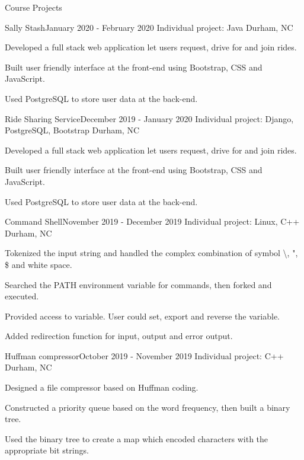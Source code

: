\documentclass{resume} %
\begin{document}
\begin{rSection}{Course Projects}
    \begin{rSubsection}{Sally Stash}{January 2020 - February 2020}
        {Individual project: Java}
        {Durham, NC}
        \item Developed a full stack web application let users request, drive for and join rides.
        \item Built user friendly interface at the front-end using Bootstrap, CSS and JavaScript.
        \item Used PostgreSQL to store user data at the back-end.
        \end{rSubsection}
    \begin{rSubsection}{Ride Sharing Service}{December 2019 - January 2020}
        {Individual project: Django, PostgreSQL, Bootstrap}
        {Durham, NC}
        \item Developed a full stack web application let users request, drive for and join rides.
        \item Built user friendly interface at the front-end using Bootstrap, CSS and JavaScript.
        \item Used PostgreSQL to store user data at the back-end.
        \end{rSubsection}

    \begin{rSubsection}{Command Shell}{November 2019 - December 2019}
    {Individual project: Linux, C++}
    {Durham, NC}
    \item Tokenized the input string and handled the complex combination of symbol \textbackslash, ", \$ and white space.
    \item Searched the PATH environment variable for commands, then forked and executed.
    \item Provided access to variable. User could set, export and reverse the variable.
    \item Added redirection function for input, output and error output.
    \end{rSubsection}


    \begin{rSubsection}{Huffman compressor}{October 2019 - November 2019}
    {Individual project: C++}
    {Durham, NC}
    \item Designed a file compressor based on Huffman coding.
    \item Constructed a priority queue based on the word frequency, then built a binary tree.
    \item Used the binary tree to create a map which encoded characters with the appropriate bit strings.
    \end{rSubsection}


\end{rSection}
\end{document}
